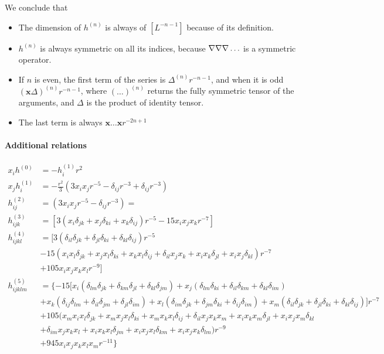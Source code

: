 \documentclass[12pt]{My_preprint}
\newcommand{\ii}{\delta}
\begin{document}
We conclude that 
\begin{itemize}
    \item The dimension of $h^{(n)}$ is always of $[L^{-n-1}]$ because of its definition. 
    \item $h^{(n)}$ is always symmetric on all its indices, because $\mathbf{\nabla}\mathbf{\nabla}\mathbf{\nabla} \ldots$ is a symmetric operator. 
    \item If $n$ is even, the first term of the series is $\Delta^{(n)} r^{-n-1}$, and when it is odd $(\textbf{x}\Delta)^{(n)} r^{-n-1}$, where $(\ldots)^{(n)}$ returns the fully symmetric tensor of the arguments, and $\Delta$ is the product of identity tensor.
    \item The last term is always $\textbf{x}\ldots\textbf{x} r^{-2n+1}$
\end{itemize}

\paragraph*{Additional relations}
\begin{align*}
    x_i h^{(0)} &= - h_i^{(1)} r^{2}\\
    x_j h^{(1)}_i &= -\frac{r^2}{3}(3 x_i x_j r^{-5} - \ii_{ij} r^{-3} + \ii_{ij} r^{-3})  \\
    h^{(2)}_{ij} &= (3 x_i x_j r^{-5} - \ii_{ij} r^{-3}) = \\
    h^{(3)}_{ijk} &= [3 (x_i \ii_{jk} + x_j \ii_{ki} + x_k \ii_{ij})r^{-5} - 15 x_ix_jx_k r^{-7}]\\
    h^{(4)}_{ijkl} &= [
    3 (\ii_{il} \ii_{jk} + \ii_{jl} \ii_{ki} + \ii_{kl} \ii_{ij})r^{-5} \\
    &- 15 (x_ix_l  \ii_{jk} + x_jx_l  \ii_{ki} + x_k x_l \ii_{ij} + \ii_{il}x_jx_k+ x_i x_k\ii_{jl}+x_ix_j\ii_{kl}) r^{-7}\\
    &+ 105  x_ix_jx_kx_l r^{-9}
    ]\\
    h^{(5)}_{ijklm} &= \{
    - 15 [
        x_i ( \ii_{lm} \ii_{jk}+\ii_{km}\ii_{jl}+\ii_{kl}\ii_{jm}) 
        + x_j ( \ii_{lm}\ii_{ki}+\ii_{il}\ii_{km}+\ii_{kl}\ii_{im})\\
        &+ x_k (\ii_{ij}\ii_{lm}+\ii_{il}\ii_{jm} +\ii_{jl}\ii_{im})
        + x_l (\ii_{im} \ii_{jk}+ \ii_{jm}\ii_{ki}+\ii_{ij}\ii_{im})
        + x_m (\ii_{il} \ii_{jk} + \ii_{jl} \ii_{ki} + \ii_{kl} \ii_{ij})
     ] r^{-7} \\
    &+ 105  (x_mx_ix_l  \ii_{jk} + x_m x_jx_l  \ii_{ki} + x_m x_k x_l\ii_{ij} + \ii_{il}x_jx_kx_m + x_i x_kx_m\ii_{jl}+x_ix_jx_m \ii_{kl}\\
    &+ \ii_{im}x_jx_kx_l+x_ix_kx_l\ii_{jm}+x_ix_jx_l\ii_{km}+x_ix_jx_k\ii_{lm}) r^{-9}\\
    &+ 945  x_ix_jx_kx_lx_m r^{-11}
    \} \\
\end{align*}
\end{document}
